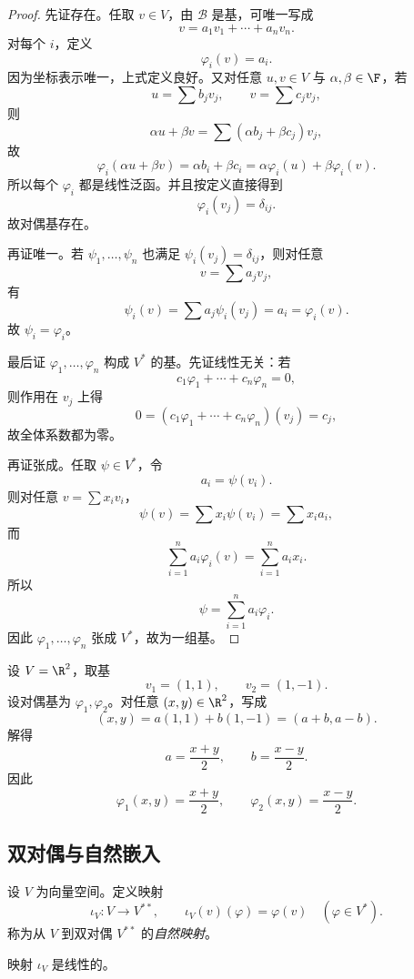 \begin{proof}
先证存在。任取 $v\in V$，由 $\mathcal B$ 是基，可唯一写成
\[
  v=a_1v_1+\cdots+a_nv_n.
\]
对每个 $i$，定义
\[
  \varphi_i(v)=a_i.
\]
因为坐标表示唯一，上式定义良好。又对任意 $u,v\in V$ 与 $\alpha,\beta\in\F$，若
\[
  u=\sum b_jv_j,\qquad v=\sum c_jv_j,
\]
则
\[
  \alpha u+\beta v=\sum (\alpha b_j+\beta c_j)v_j,
\]
故
\[
  \varphi_i(\alpha u+\beta v)=\alpha b_i+\beta c_i
  =\alpha\varphi_i(u)+\beta\varphi_i(v).
\]
所以每个 $\varphi_i$ 都是线性泛函。并且按定义直接得到
\[
  \varphi_i(v_j)=\delta_{ij}.
\]
故对偶基存在。

再证唯一。若 $\psi_1,\dots,\psi_n$ 也满足 $\psi_i(v_j)=\delta_{ij}$，则对任意
\[
  v=\sum a_jv_j,
\]
有
\[
  \psi_i(v)=\sum a_j\psi_i(v_j)=a_i=\varphi_i(v).
\]
故 $\psi_i=\varphi_i$。

最后证 $\varphi_1,\dots,\varphi_n$ 构成 $V^*$ 的基。先证线性无关：若
\[
  c_1\varphi_1+\cdots+c_n\varphi_n=0,
\]
则作用在 $v_j$ 上得
\[
  0=(c_1\varphi_1+\cdots+c_n\varphi_n)(v_j)=c_j,
\]
故全体系数都为零。

再证张成。任取 $\psi\in V^*$，令
\[
  a_i=\psi(v_i).
\]
则对任意 $v=\sum x_iv_i$，
\[
  \psi(v)=\sum x_i\psi(v_i)=\sum x_i a_i,
\]
而
\[
  \sum_{i=1}^n a_i\varphi_i(v)=\sum_{i=1}^n a_i x_i.
\]
所以
\[
  \psi=\sum_{i=1}^n a_i\varphi_i.
\]
因此 $\varphi_1,\dots,\varphi_n$ 张成 $V^*$，故为一组基。
\end{proof}

\begin{example}
设 $V=\R^2$，取基
\[
  v_1=(1,1),\qquad v_2=(1,-1).
\]
设对偶基为 $\varphi_1,\varphi_2$。对任意 $(x,y)\in\R^2$，写成
\[
  (x,y)=a(1,1)+b(1,-1)= (a+b, a-b).
\]
解得
\[
  a=\frac{x+y}{2},\qquad b=\frac{x-y}{2}.
\]
因此
\[
  \varphi_1(x,y)=\frac{x+y}{2},
  \qquad
  \varphi_2(x,y)=\frac{x-y}{2}.
\]
\end{example}

\subsection{双对偶与自然嵌入}

\begin{definition}
设 $V$ 为向量空间。定义映射
\[
  \iota_V\colon V\to V^{**},
  \qquad
  \iota_V(v)(\varphi)=\varphi(v)
  \quad (\varphi\in V^*) .
\]
称为从 $V$ 到双对偶 $V^{**}$ 的\emph{自然映射}。
\end{definition}

\begin{proposition}
映射 $\iota_V$ 是线性的。
\end{proposition}

